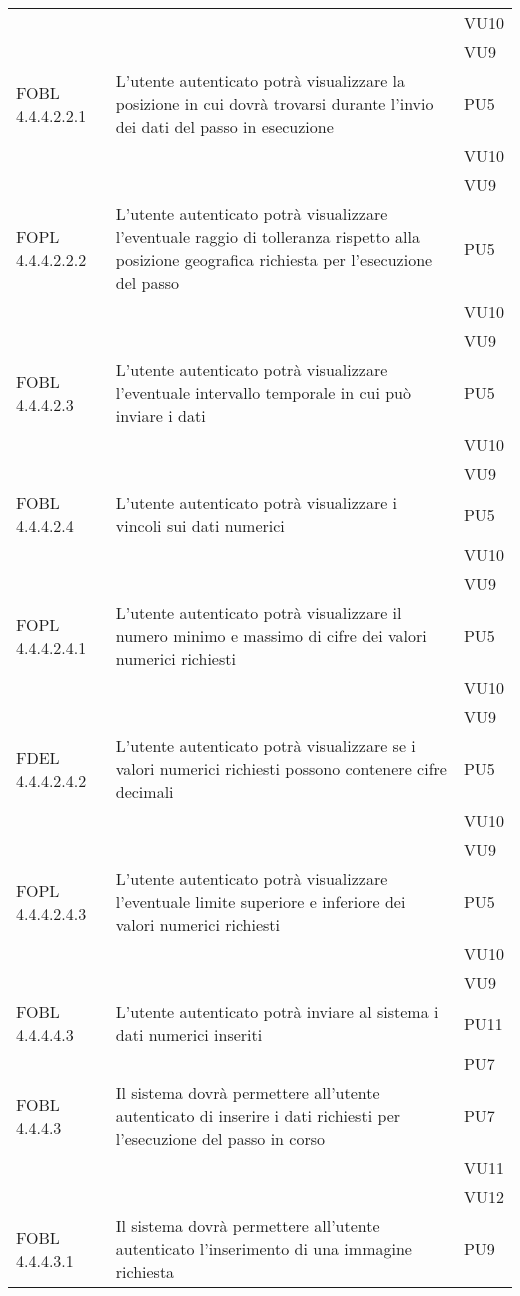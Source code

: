 \begin{longtable}{lXp{}}
&&VU10\\ 
&&VU9\\ 
\midrule 
FOBL 4.4.4.2.2.1&L'utente autenticato potrà visualizzare la posizione in cui dovrà trovarsi durante l'invio dei dati del passo in esecuzione&PU5\\ 
&&VU10\\ 
&&VU9\\ 
\midrule 
FOPL 4.4.4.2.2.2&L'utente autenticato potrà visualizzare l'eventuale raggio di tolleranza rispetto alla posizione geografica richiesta per l'esecuzione del passo	 &PU5\\ 
&&VU10\\ 
&&VU9\\ 
\midrule 
FOBL 4.4.4.2.3&L'utente autenticato potrà visualizzare l'eventuale intervallo temporale in cui può inviare i dati&PU5\\ 
&&VU10\\ 
&&VU9\\ 
\midrule 
FOBL 4.4.4.2.4&L'utente autenticato potrà visualizzare i vincoli sui dati numerici&PU5\\ 
&&VU10\\ 
&&VU9\\ 
\midrule 
FOPL 4.4.4.2.4.1&L'utente autenticato potrà visualizzare il numero minimo e massimo di cifre dei valori numerici richiesti&PU5\\ 
&&VU10\\ 
&&VU9\\ 
\midrule 
FDEL 4.4.4.2.4.2&L'utente autenticato potrà visualizzare se i valori numerici richiesti possono contenere cifre decimali&PU5\\ 
&&VU10\\ 
&&VU9\\ 
\midrule 
FOPL 4.4.4.2.4.3&L'utente autenticato potrà visualizzare l'eventuale limite superiore e inferiore dei valori numerici richiesti &PU5\\ 
&&VU10\\ 
&&VU9\\ 
\midrule 
FOBL 4.4.4.4.3&L'utente autenticato potrà inviare al sistema i dati numerici inseriti&PU11\\ 
&&PU7\\ 
\midrule 
FOBL 4.4.4.3&Il sistema dovrà permettere all'utente autenticato di inserire i dati richiesti per l'esecuzione del passo in corso&PU7\\ 
&&VU11\\ 
&&VU12\\ 
\midrule 
FOBL 4.4.4.3.1&Il sistema dovrà permettere all'utente autenticato l'inserimento di una immagine richiesta&PU9\\ 

\end{longtable}
